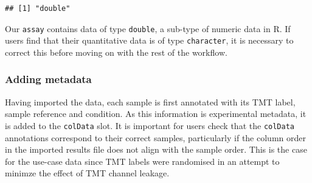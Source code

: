 \documentclass[9pt,a4paper,]{extarticle}
\newenvironment{Shaded}{\begin{snugshade}}{\end{snugshade}}
\newcommand{\DocumentationTok}[1]{\textcolor[rgb]{0.56,0.35,0.01}{\textbf{\textit{#1}}}}
\newcommand{\FunctionTok}[1]{\textcolor[rgb]{0.13,0.29,0.53}{\textbf{#1}}}
\newcommand{\NormalTok}[1]{#1}
\newcommand{\OtherTok}[1]{\textcolor[rgb]{0.56,0.35,0.01}{#1}}
\newcommand{\SpecialCharTok}[1]{\textcolor[rgb]{0.81,0.36,0.00}{\textbf{#1}}}
\newcommand{\StringTok}[1]{\textcolor[rgb]{0.31,0.60,0.02}{#1}}
\begin{document}
\begin{verbatim}
## [1] "double"
\end{verbatim}

Our \texttt{assay} contains data of type \texttt{double}, a sub-type of numeric data in R. If
users find that their quantitative data is of type \texttt{character}, it is necessary
to correct this before moving on with the rest of the workflow.

\subsubsection{Adding metadata}\label{adding-metadata}

Having imported the data, each sample is first annotated with its TMT label,
sample reference and condition. As this information is experimental metadata, it
is added to the \texttt{colData} slot. It is important for users check that the \texttt{colData}
annotations correspond to their correct samples, particularly if the column order
in the imported results file does not align with the sample order. This is the
case for the use-case data since TMT labels were randomised in an attempt to
minimze the effect of TMT channel leakage.

\begin{Shaded}
\end{Shaded}
\end{document}
